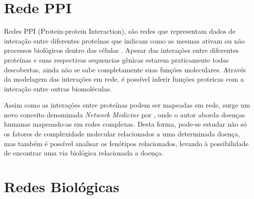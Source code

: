 


\section{Rede PPI}

Redes PPI (Protein-protein Interaction), são redes que representam dados de interação entre diferentes proteínas que indicam como as mesmas ativam ou não processos biológicos dentro das células \cite{Pavlopoulos2011}.
Apesar das interações entre diferentes proteínas e suas respectivas sequencias gênicas estarem praticamente todas descobertas, ainda não se sabe completamente suas funções moleculares.
Através da modelagem das interações em rede, é possível inferir funções proteicas com a interação entre outras biomoléculas.
%

Assim como as interações entre proteínas podem ser mapeadas em rede, surge um novo conceito denominada \textsl{Network Medicine} por \cite{Barabasi2011}, onde o autor aborda doenças humanas mapeando-as em redes complexas. Desta forma, pode-se estudar não só os fatores de complexidade molecular relacionados a uma determinada doença, mas também é possível analisar os fenótipos relacionados, levando à possibilidade de encontrar uma via biológica relacionada a doença.

\section{Redes Biológicas}





